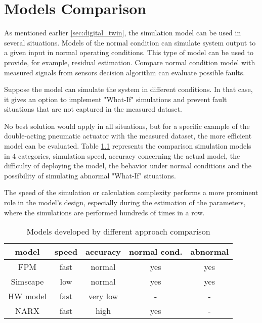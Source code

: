 \chapter{Models Comparison}\label{ch:compare}

As mentioned earlier \ref{sec:digital_twin}, the simulation model can be used in several
situations.  Models of the normal condition can simulate system output to a
given input in normal operating conditions. This type of model can be used
to provide, for example, residual estimation. Compare normal condition
model with measured signals from sensors decision algorithm can evaluate
possible faults. 

Suppose the model can simulate the system in different conditions. In that
case, it gives an option to implement  "What-If" simulations and prevent
fault situations that are not captured in the measured dataset.

No best solution would apply in all situations, but for a specific example
of the double-acting pneumatic actuator with the measured dataset, the more
efficient model can be evaluated. Table \ref{tab:models_compare} represents the comparison
simulation models in 4 categories, simulation speed, accuracy concerning
the actual model, the difficulty of deploying the model, the behavior under
normal conditions and the possibility of simulating abnormal "What-If"
situations.

The speed of the simulation or calculation complexity performs a more
prominent role in the model's design, especially during the estimation of
the parameters, where the simulations are performed hundreds of times in a
row.

\begin{table}[h]
    \centering
    \begin{tabular}{|c|c|c|c|c|}
\hline
\textbf{model} &\textbf{speed} &\textbf{accuracy} &\textbf{normal cond.} &\textbf{abnormal} \\
\hline
FPM            & fast          & normal           & yes                  & yes \\
Simscape       & low           & normal           & yes                  & yes \\
HW model       & fast          & very low         & -                    & - \\
NARX           & fast          & high             & yes                  & - \\
\hline
    \end{tabular}
    \caption{Models developed by different approach comparison}
    \label{tab:models_compare}
\end{table}
    

